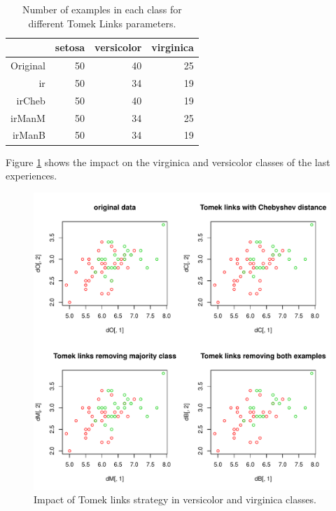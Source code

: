\documentclass[10pt,a4paper]{article}\usepackage[]{graphicx}\usepackage[]{color}
\makeatletter
\def\maxwidth{ %
  \ifdim\Gin@nat@width>\linewidth
    \linewidth
  \else
    \Gin@nat@width
  \fi
}
\newenvironment{knitrout}{}{} %
\makeatother
\begin{document}
\begin{table}[ht]
\centering
\begin{tabular}{rrrr}
  \hline
 & setosa & versicolor & virginica \\ 
  \hline
Original &  50 &  40 &  25 \\ 
  ir &  50 &  34 &  19 \\ 
  irCheb &  50 &  40 &  19 \\ 
  irManM &  50 &  34 &  25 \\ 
  irManB &  50 &  34 &  19 \\ 
   \hline
\end{tabular}
\caption{Number of examples in each class for different Tomek Links parameters.} 
\label{tab:TL_table}
\end{table}



Figure \ref{fig:TL_difPar} shows the impact on the virginica and versicolor classes of the last experiences.
\begin{knitrout}\footnotesize
{}\color{fgcolor}\begin{figure}

{\centering \includegraphics[width=\maxwidth]{figures/UBL-TL_difPar-1} 

}

\caption[Impact of Tomek links strategy in versicolor and virginica classes]{Impact of Tomek links strategy in versicolor and virginica classes.}\label{fig:TL_difPar}
\end{figure}


\end{knitrout}
\end{document}
